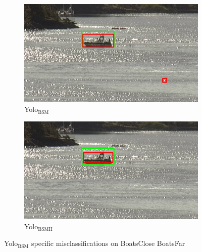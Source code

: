 \begin{figure}[h!]
\begin{subfigure}{.5\textwidth}
  \centering
  \includegraphics[width=0.9\linewidth]{results/case_buildings/yolo23/grove/yolo2/selected_08_11_frame1070.jpg}
  \caption{Yolo$_{\text{BSM}}$}
\end{subfigure}%
\begin{subfigure}{.5\textwidth}
  \centering
  \includegraphics[width=.9\linewidth]{results/case_buildings/yolo23/grove/yolo3/selected_08_11_frame1070.jpg}
  \caption{Yolo$_{\text{BSMH}}$}
\end{subfigure}
\caption{Yolo$_{\text{BSM}}$ specific misclassifications on BoatsClose BoatsFar}
\label{img:yolo2_misclas}

\end{figure}

\newpage

